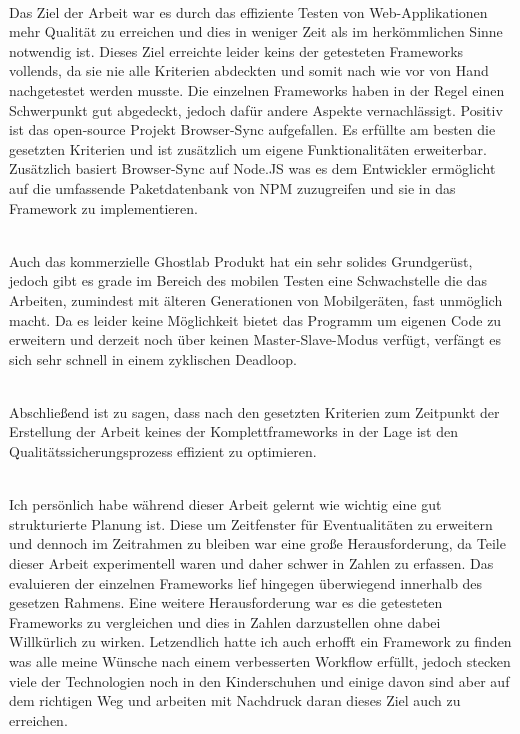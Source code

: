 \\Das Ziel der Arbeit war es durch das effiziente Testen von Web-Applikationen mehr Qualität zu erreichen und dies in weniger Zeit als im herkömmlichen Sinne notwendig ist. Dieses Ziel erreichte leider keins der getesteten Frameworks vollends, da sie nie alle Kriterien abdeckten und somit nach wie vor von Hand nachgetestet werden musste. 
Die einzelnen Frameworks haben in der Regel einen Schwerpunkt gut abgedeckt, jedoch dafür andere Aspekte vernachlässigt. Positiv ist das open-source Projekt Browser-Sync aufgefallen. Es erfüllte am besten die gesetzten Kriterien und ist zusätzlich um eigene Funktionalitäten erweiterbar. Zusätzlich basiert Browser-Sync auf Node.JS was es dem Entwickler ermöglicht auf die umfassende Paketdatenbank von NPM zuzugreifen und sie in das Framework zu implementieren. 

\\Auch das kommerzielle Ghostlab Produkt hat ein sehr solides Grundgerüst, jedoch gibt es grade im Bereich des mobilen Testen eine Schwachstelle die das Arbeiten, zumindest mit älteren Generationen von Mobilgeräten, fast unmöglich macht. Da es leider keine Möglichkeit bietet das Programm um eigenen Code zu erweitern und derzeit noch über keinen Master-Slave-Modus verfügt, verfängt es sich sehr schnell in einem zyklischen Deadloop.

\\Abschließend ist zu sagen, dass nach den gesetzten Kriterien zum Zeitpunkt der Erstellung der Arbeit keines der Komplettframeworks in der Lage ist den Qualitätssicherungsprozess effizient zu optimieren.

\\Ich persönlich habe während dieser Arbeit gelernt wie wichtig eine gut strukturierte Planung ist. Diese um Zeitfenster für Eventualitäten zu erweitern und dennoch im Zeitrahmen zu bleiben war eine große Herausforderung, da Teile dieser Arbeit experimentell waren und daher schwer in Zahlen zu erfassen. Das evaluieren der einzelnen Frameworks lief hingegen überwiegend innerhalb des gesetzen Rahmens. Eine weitere Herausforderung war es die getesteten Frameworks zu vergleichen und dies in Zahlen darzustellen ohne dabei Willkürlich zu wirken. Letzendlich hatte ich auch erhofft ein Framework zu finden was alle meine Wünsche nach einem verbesserten Workflow erfüllt, jedoch stecken viele der Technologien noch in den Kinderschuhen und einige davon sind aber auf dem richtigen Weg und arbeiten mit Nachdruck daran dieses Ziel auch zu erreichen.

